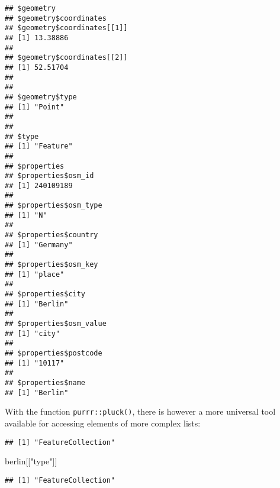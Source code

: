 \documentclass[]{book}
\newenvironment{Shaded}{\begin{snugshade}}{\end{snugshade}}
\newcommand{\DecValTok}[1]{\textcolor[rgb]{0.00,0.00,0.81}{#1}}
\newcommand{\KeywordTok}[1]{\textcolor[rgb]{0.13,0.29,0.53}{\textbf{#1}}}
\newcommand{\NormalTok}[1]{#1}
\newcommand{\OperatorTok}[1]{\textcolor[rgb]{0.81,0.36,0.00}{\textbf{#1}}}
\newcommand{\StringTok}[1]{\textcolor[rgb]{0.31,0.60,0.02}{#1}}
\begin{document}
\begin{Shaded}
\end{Shaded}

\begin{verbatim}
## $geometry
## $geometry$coordinates
## $geometry$coordinates[[1]]
## [1] 13.38886
## 
## $geometry$coordinates[[2]]
## [1] 52.51704
## 
## 
## $geometry$type
## [1] "Point"
## 
## 
## $type
## [1] "Feature"
## 
## $properties
## $properties$osm_id
## [1] 240109189
## 
## $properties$osm_type
## [1] "N"
## 
## $properties$country
## [1] "Germany"
## 
## $properties$osm_key
## [1] "place"
## 
## $properties$city
## [1] "Berlin"
## 
## $properties$osm_value
## [1] "city"
## 
## $properties$postcode
## [1] "10117"
## 
## $properties$name
## [1] "Berlin"
\end{verbatim}

With the function \texttt{purrr::pluck()}, there is however a more universal tool available for accessing elements of more complex lists:

\begin{Shaded}
\end{Shaded}

\begin{verbatim}
## [1] "FeatureCollection"
\end{verbatim}

\begin{Shaded}
\begin{Highlighting}[]
\NormalTok{berlin[[}\StringTok{"type"}\NormalTok{]]}
\end{Highlighting}
\end{Shaded}

\begin{verbatim}
## [1] "FeatureCollection"
\end{verbatim}

\begin{Shaded}
\end{Shaded}
\end{document}
